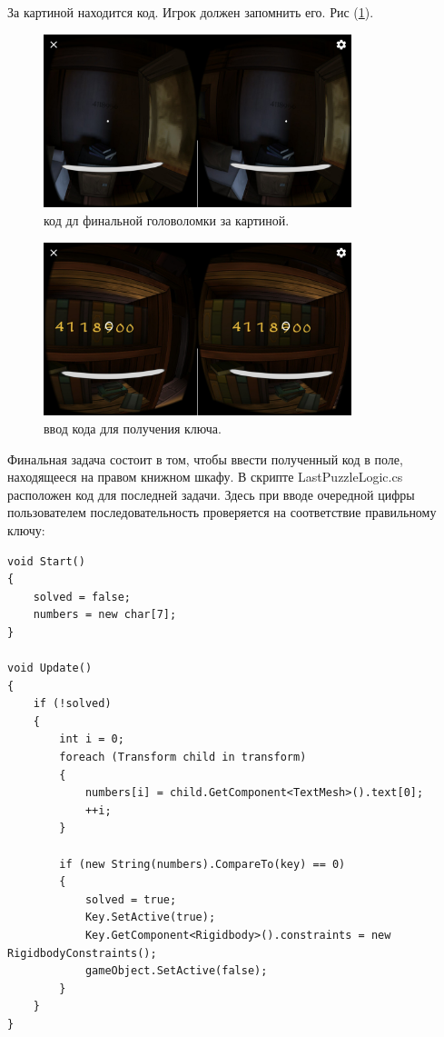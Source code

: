 За картиной находится код. Игрок  должен запомнить его. Рис (\ref{code}).

\begin{figure}[h!]
    \centering
    \includegraphics[width=0.8\textwidth]{./screenshots/code.jpg}
    \caption{\small{код дл финальной головоломки за картиной.}}
    \label{code}
\end{figure} 

\begin{figure}[h!]
    \centering
    \includegraphics[width=0.8\textwidth]{./screenshots/last_code.jpg}
    \caption{\small{ввод кода для получения ключа.}}
    \label{last_code}
\end{figure} 

\newpage
Финальная задача состоит в том, чтобы ввести полученный код в поле, находящееся на правом книжном шкафу. 
В скрипте LastPuzzleLogic.cs расположен код для последней задачи. Здесь при вводе очередной цифры пользователем последовательность проверяется на соответствие правильному ключу:

\begin{small}
    \begin{verbatim}
void Start()
{
    solved = false;
    numbers = new char[7];
}

void Update()
{
    if (!solved)
    {
        int i = 0;
        foreach (Transform child in transform)
        {
            numbers[i] = child.GetComponent<TextMesh>().text[0];
            ++i;
        }
        
        if (new String(numbers).CompareTo(key) == 0)
        {
            solved = true;
            Key.SetActive(true);
            Key.GetComponent<Rigidbody>().constraints = new RigidbodyConstraints();
            gameObject.SetActive(false);
        }
    }
}
    \end{verbatim}
\end{small}

